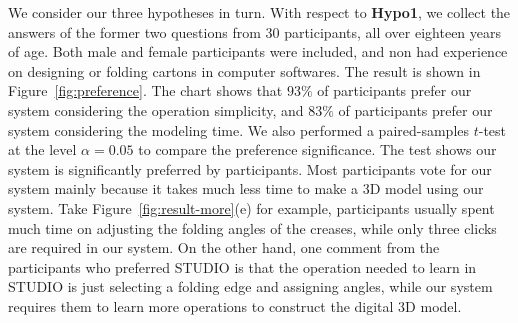 




We consider our three hypotheses in turn. 
With respect to \textbf{Hypo1}, we collect the answers of the former two questions from 30 participants, all over eighteen years of age. Both male and female participants were included, and non had experience on designing or folding cartons in computer softwares. 
%
The result is shown in Figure~\ref{fig:preference}. 
The chart shows that $93\%$ of participants prefer our system considering the operation simplicity, and $83\%$ of participants prefer our system considering the modeling time.
%
We also performed a paired-samples $t$-test at the level $\alpha = 0.05$ to compare the preference significance.
%
The test shows our system is significantly preferred by participants.
%
Most participants vote for our system mainly because it takes much less time to make a 3D model using our system. 
Take Figure~\ref{fig:result-more}(e) for example, participants usually spent much time on adjusting the folding angles of the creases, while only three clicks are required in our system.
%
On the other hand, one comment from the participants who preferred STUDIO is that the operation needed to learn in STUDIO is just selecting a folding edge and assigning angles, while our system requires them to learn more operations to construct the digital 3D model. 
%

